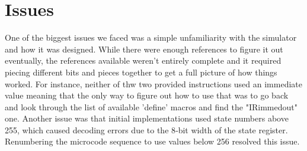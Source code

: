 \documentclass[acmtog]{acmart}
\begin{document}
\section{Issues}
One of the biggest issues we faced was a simple unfamiliarity with the simulator and how it was designed. While there were enough references to figure it out
eventually, the references available weren't entirely complete and it required piecing different bits and pieces together to get a full picture of how things
worked. For instance, neither of thw two provided instructions used an immediate value meaning that the only way to figure out how to use that was to go back 
and look through the list of available 'define' macros and find the "IRimmedout" one.
Another issue was that initial implementations used state numbers above 255, which caused decoding errors due to the 8‑bit width of the state register. Renumbering the microcode sequence to use values below 256 resolved this issue.
\end{document}
